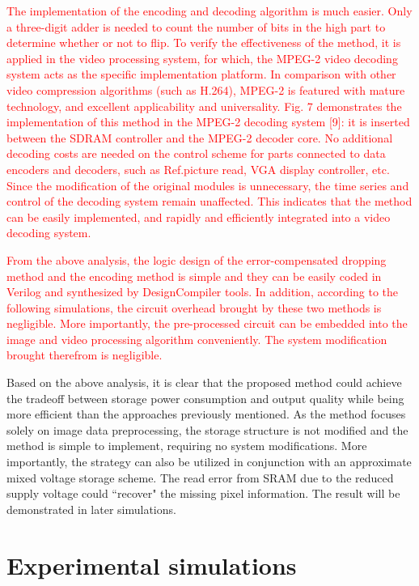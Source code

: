 \documentclass[lettersize,journal]{IEEEtran}
\begin{document}
\textcolor{red}{The implementation of the encoding and decoding algorithm is much easier. Only a three-digit adder is needed to count the number of bits in the high part to determine whether or not to flip. To verify the effectiveness of the method, it is applied in the video processing system, for which, the MPEG-2 video decoding system acts as the specific implementation platform. In comparison with other video compression algorithms (such as H.264), MPEG-2 is featured with mature technology, and excellent applicability and universality. Fig. 7 demonstrates the implementation of this method in the MPEG-2 decoding system [9]: it is inserted between the SDRAM controller and the MPEG-2 decoder core. No additional decoding costs are needed on the control scheme for parts connected to data encoders and decoders, such as Ref.picture read, VGA display controller, etc. Since the modification of the original modules is unnecessary, the time series and control of the decoding system remain unaffected. This indicates that the method can be easily implemented, and rapidly and efficiently integrated into a video decoding system.}

\textcolor{red}{From the above analysis, the logic design of the error-compensated dropping method and the encoding method is simple and they can be easily coded in Verilog and synthesized by DesignCompiler tools. In addition, according to the following simulations, the circuit overhead brought by these two methods is negligible. More importantly, the pre-processed circuit can be embedded into the image and video processing algorithm conveniently. The system modification brought therefrom is negligible.}


Based on the above analysis, it is clear that the proposed method could achieve the tradeoff between storage power consumption and output quality while being more efficient than the approaches previously mentioned. As the method focuses solely on image data preprocessing, the storage structure is not modified and the method is simple to implement, requiring no system modifications. More importantly, the strategy can also be utilized in conjunction with an approximate mixed voltage storage scheme. The read error from SRAM due to the reduced supply voltage could ``recover" the missing pixel information. The result will be demonstrated in later simulations.\\

\section{Experimental simulations} \label{sec4}
\end{document}
